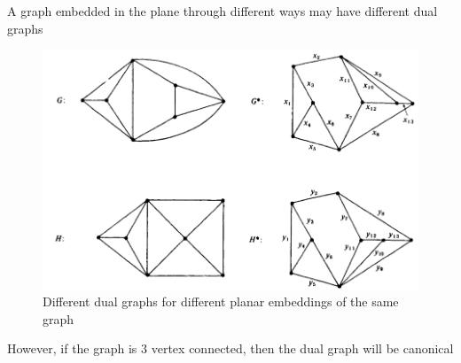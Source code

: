 \documentclass[main]{subfiles}
\begin{document}
\begin{remark}
A graph embedded in the plane through different ways may have different dual graphs
\begin{figure}[ht!]
\centering
\includegraphics[scale=0.3]{Pictures/Different_dual_graphs.png}
\caption{Different dual graphs for different planar embeddings of the same graph}\label{Different dual graphs}
\end{figure}
However, if the graph is $3$ vertex connected, then the dual graph will be canonical
\end{remark}
\end{document}
